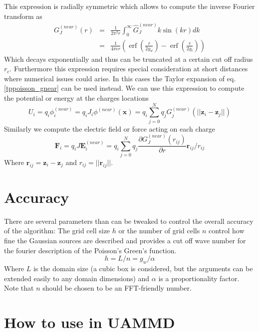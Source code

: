 \documentclass[ twoside,openright,titlepage,numbers=noenddot,%
headinclude,footinclude,cleardoublepage=empty,abstract=on,
BCOR=5mm,paper=a4,fontsize=11pt
]{scrreprt}
\renewcommand{\vec}[1]{\bm{#1}}
\DeclareMathOperator{\erf}{erf}
\begin{document}
This expression is radially symmetric which allows to compute the inverse Fourier transform as
\begin{eqnarray}
  \label{tppoisson_gnear}
  G_J^{(near)}(r) &=& \frac{1}{2\pi^2r}\int_0^\infty{\hat{G}^{(near)}_Jk \sin(kr)dk}\nonumber \\
            &=& \frac{1}{4\pi\epsilon r}\left(\erf\left(\frac{r}{2g_w}\right) - \erf\left(\frac{r}{2g_t}\right)\right)
\end{eqnarray}
Which decays exponentially and thus can be truncated at a certain cut off radius $r_c$. Furthermore this expression requires special consideration at short distances where numerical issues could arise. In this cases the Taylor expansion of eq. \eqref{tppoisson_gnear} can be used instead.
We can use this expression to compute the potential or energy at the charges locations
\begin{equation}
  U_i = q_i\phi^{(near)}_i = q_iJ_i\phi^{(near)}(\vec{x}) = q_i\sum_{j=0}^N{q_jG_j^{(near)}(||\vec{z}_i - \vec{z}_j||)}
\end{equation}
Similarly we compute the electric field or force acting on each charge 
\begin{equation}
  \vec{F}_i = q_i J \vec{E}^{(near)}_i = q_i\sum_{j=0}^N{q_j\frac{\partial G_J^{(near)}(r_{ij})}{\partial r}\vec{r}_{ij}/r_{ij}}
\end{equation}
Where $\vec{r}_{ij} = \vec{z}_i - \vec{z}_j$ and $r_{ij} = ||\vec{r}_{ij}||$.

\section{Accuracy}
There are several parameters than can be tweaked to control the overall accuracy of the algorithm:
The grid cell size $h$ or the number of grid cells $n$ control how fine the Gaussian sources are described and provides a cut off wave number for the fourier description of the Poisson's Green's function.
\begin{equation}
h = L/n = g_w/\alpha
\end{equation}
Where $L$ is the domain size (a cubic box is considered, but the arguments can be extended easily to any domain dimensions) and $\alpha$ is a proportionality factor. Note that $n$ should be chosen to be an \gls{FFT}-friendly number.


\section{How to use in UAMMD}
\end{document}
